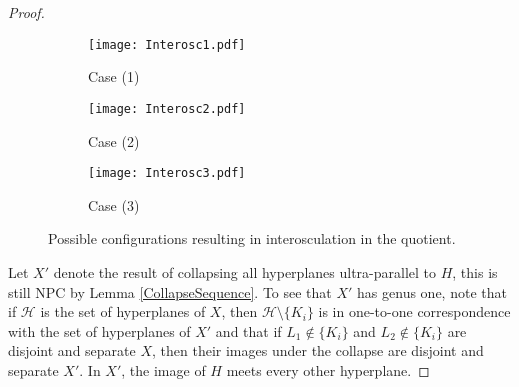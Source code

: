 \documentclass[11pt]{amsart}
\numberwithin{thm}{section}
\theoremstyle{remark}
\theoremstyle{definition}
\begin{document}
\begin{proof}
\begin{figure*}[h!]

\centering
\begin{subfigure}[t]{0.5\textwidth}
\texttt{[image: Interosc1.pdf]}
\centering
\caption*{Case (1)}
\label{Interosc1}
\end{subfigure}
\quad
\begin{subfigure}[t]{0.5\textwidth}
\centering
\texttt{[image: Interosc2.pdf]}
\caption*{Case (2)}
\label{Interosc2}
\end{subfigure}
\quad
\begin{subfigure}[t]{0.5\textwidth}
\centering
\texttt{[image: Interosc3.pdf]}
\caption*{Case (3)}
\label{Interosc3}
\end{subfigure}
\caption{Possible configurations resulting in interosculation in the quotient.}
\label{fig:Genus1Inter}
\end{figure*}



Let $X'$ denote the result of collapsing all hyperplanes ultra-parallel to $H$, this is still NPC by Lemma \ref{CollapseSequence}. To see that $X'$ has genus one, note that if $\mathcal{H}$ is the set of hyperplanes of $X$, then $\mathcal{H}\setminus\{K_i\}$ is in one-to-one correspondence with the set of hyperplanes of $X'$ and that if $L_1\notin \{K_i\}$ and $L_2\notin\{K_i\}$ are disjoint and separate $X$, then their images under the collapse are disjoint and separate $X'$. In $X'$, the image of $H$ meets every other hyperplane. 


\end{proof}
\end{document}
